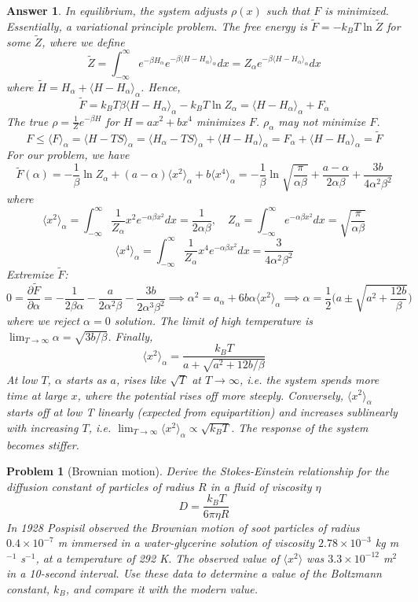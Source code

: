 \documentclass[a4paper]{article}
\theoremstyle{new2}
\newtheorem{ans}{Answer}[section]
\theoremstyle{new}
\newtheorem{qns}{Problem}[section]
\begin{document}
\begin{ans}
In equilibrium, the system adjusts $\rho(x)$ such that $F$ is minimized. Essentially, a variational principle problem. The free energy is $\tilde{F}=-k_BT\ln\tilde{Z}$ for some $\tilde{Z}$, where we define 
$$\tilde{Z}=\int_{-\infty}^\infty e^{-\beta H_\alpha}e^{-\beta\langle H-H_\alpha\rangle_\alpha}dx=Z_\alpha e^{-\beta\langle H-H_\alpha\rangle_\alpha}dx$$
where $\tilde{H}=H_\alpha+\langle H-H_\alpha\rangle_\alpha$. Hence,
$$\tilde{F}=k_BT\beta\langle H-H_\alpha\rangle_\alpha-k_BT\ln Z_\alpha=\langle H-H_\alpha\rangle_\alpha+F_\alpha$$
The true $\rho=\frac{1}{Z}e^{-\beta H}$ for $H=ax^2+bx^4$ minimizes $F$. $\rho_\alpha$ may not minimize $F$.
$$F\leq\langle F\rangle_\alpha=\langle H-TS\rangle_\alpha=\langle H_\alpha-TS\rangle_\alpha+\langle H-H_\alpha\rangle_\alpha=F_\alpha+\langle H-H_\alpha\rangle_\alpha=\tilde{F}$$
For our problem, we have
$$\tilde{F}(\alpha)=-\frac{1}{\beta}\ln Z_\alpha+(a-\alpha)\langle x^2\rangle_\alpha+b\langle x^4\rangle_\alpha=-\frac{1}{\beta}\ln\sqrt{\frac{\pi}{\alpha\beta}}+\frac{a-\alpha}{2\alpha\beta}+\frac{3b}{4\alpha^2\beta^2}$$
where
$$\langle x^2\rangle_\alpha=\int_{-\infty}^\infty\frac{1}{Z_\alpha}x^2e^{-\alpha\beta x^2}dx=\frac{1}{2\alpha\beta},\quad Z_\alpha=\int_{-\infty}^\infty e^{-\alpha\beta x^2}dx=\sqrt{\frac{\pi}{\alpha\beta}}$$
$$\langle x^4\rangle_\alpha=\int_{-\infty}^\infty\frac{1}{Z_\alpha}x^4e^{-\alpha\beta x^2}dx=\frac{3}{4\alpha^2\beta^2}$$
Extremize $\tilde{F}$:
$$0=\frac{\partial\tilde{F}}{\partial\alpha}=-\frac{1}{2\beta\alpha}-\frac{a}{2\alpha^2\beta}-\frac{3b}{2\alpha^3\beta^2}\implies\alpha^2=a_\alpha+6b\alpha\langle x^2\rangle_\alpha\implies\alpha=\frac{1}{2}\bigg(a\pm\sqrt{a^2+\frac{12b}{\beta}}\bigg)$$
where we reject $\alpha=0$ solution. The limit of high temperature is $\lim_{T\rightarrow\infty}\alpha=\sqrt{3b/\beta}$. Finally,
$$\langle x^2\rangle_\alpha=\frac{k_BT}{a+\sqrt{a^2+12b/\beta}}$$
At low $T$, $\alpha$ starts as $a$, rises like $\sqrt{T}$ at $T\rightarrow\infty$, i.e. the system spends more time at large $x$, where the potential rises off more steeply. Conversely, $\langle x^2\rangle_\alpha$ starts off at low T linearly (expected from equipartition) and increases sublinearly with increasing $T$, i.e. $\lim_{T\rightarrow\infty}\langle x^2\rangle_\alpha\propto\sqrt{k_BT}$. The response of the system becomes stiffer.
\end{ans}
\newpage
\begin{qns}[Brownian motion]
Derive the Stokes-Einstein relationship for the diffusion constant of particles of radius $R$ in a fluid of viscosity $\eta$
$$D=\frac{k_BT}{6\pi\eta R}$$
In 1928 Pospisil observed the Brownian motion of soot particles of radius $0.4\times10^{-7}$ m immersed in a water-glycerine solution of viscosity $2.78\times10^{-3}$ kg m$^{−1}$ s$^{−1}$, at a temperature of 292 K. The observed value of $\langle x^2\rangle$ was $3.3\times10^{-12}$ m$^2$ in a 10-second interval. Use these data to determine a value of the Boltzmann constant, $k_B$, and compare it with the modern value.
\end{qns}
\end{document}
